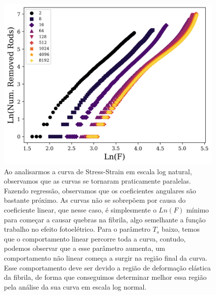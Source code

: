 \documentclass{article}
\begin{document}
\begin{figure}[H]
    \centering
    \includegraphics[width=\textwidth]{figures/ln_stress_strain.png}

    \caption{Ao analisarmos a curva de Stress-Strain em escala log natural, observamos que as curvas se tornaram praticamente paralelas. Fazendo regressão, observamos que os coeficientes angulares são bastante próximo. As curvas não se sobrepõem por causa do coeficiente linear, que nesse caso, é simplesmente o $Ln(F)$ mínimo para começar a causar quebras na fibrila, algo semelhante a função trabalho no efeito fotoelétrico. Para o parâmetro $T_{s}$ baixo, temos que o comportamento linear percorre toda a curva, contudo, podemos observar que a esse parâmetro aumenta, um comportamento não linear começa a surgir na região final da curva. Esse comportamento deve ser devido a região de deformação elástica da fibrila, de forma que conseguimos determinar melhor essa região pela análise da sua curva em escala log normal.} 

    \label{}
\end{figure}



    
\end{document}
